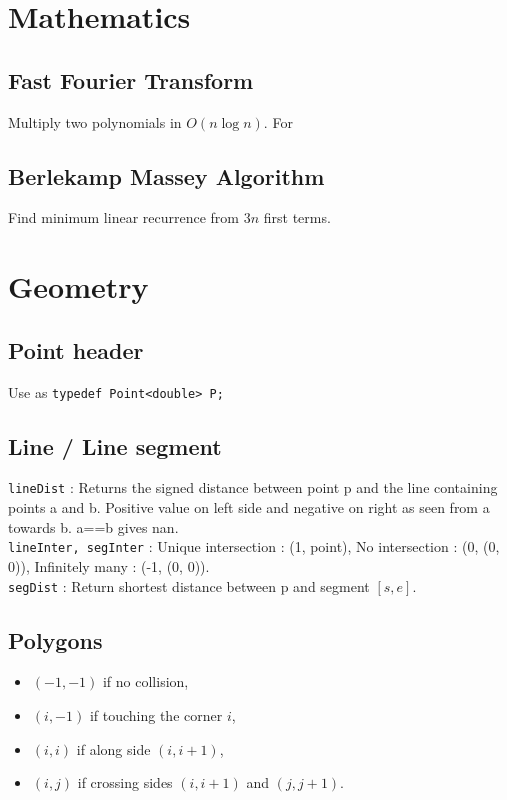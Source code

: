 \documentclass[landscape]{article}
\begin{document}
\begin{multicols}{3 }
\section{Mathematics}
    \subsection{Fast Fourier Transform}
        Multiply two polynomials in $O(n \log n)$. For
        

    \subsection{Berlekamp Massey Algorithm}
        Find minimum linear recurrence from $3n$ first terms.
        

\section{Geometry}
    \subsection{Point header}
        Use as \texttt{typedef Point<double> P;}
        
    \subsection{Line / Line segment}
        \texttt{lineDist} : Returns the signed distance between point p and the line containing points a and b. Positive value on left side and negative on right as seen from a towards b. a==b gives nan.\\
        \texttt{lineInter, segInter} : Unique intersection : (1, point), No intersection : (0, (0, 0)), Infinitely many : (-1, (0, 0)).\\
        \texttt{segDist} : Return shortest distance between p and segment $[s, e]$.
        

    \subsection{Polygons}
        
            \begin{itemize}
                \item $(-1, -1)$ if no collision,
                \item $(i, -1)$ if touching the corner $i$,
                \item $(i, i)$ if along side $(i, i+1)$,
                \item $(i, j)$ if crossing sides $(i, i+1)$ and $(j, j+1)$.
            \end{itemize}
        


\end{multicols}
\end{document}
